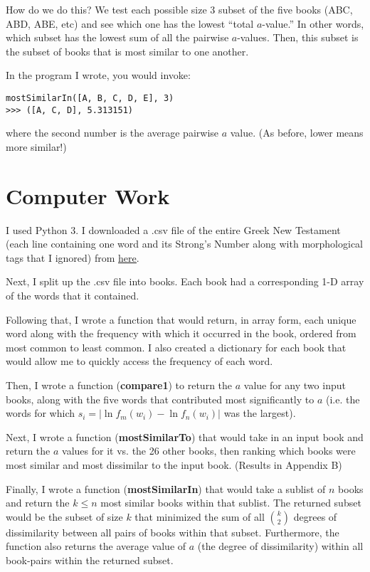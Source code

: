 \documentclass[12pt,letterpaper]{article}
\begin{document}
How do we do this?  We test each possible size 3 subset of the five books (ABC, ABD, ABE, etc) and see which one has the lowest ``total $a$-value.''  In other words, which subset has the lowest sum of all the pairwise $a$-values.  Then, this subset is the subset of books that is most similar to one another.

In the program I wrote, you would invoke:
\begin{verbatim}
mostSimilarIn([A, B, C, D, E], 3)
>>> ([A, C, D], 5.313151)
\end{verbatim}
where the second number is the average pairwise $a$ value.  (As before, lower means more similar!)

\section{Computer Work}
I used Python 3.  I downloaded a .csv file of the entire Greek New Testament (each line containing one word and its Strong's Number along with morphological tags that I ignored) from \underline{\href{https://github.com/biblicalhumanities/Nestle1904/tree/master/morph}{here}}.  

Next, I split up the .csv file into books.  Each book had a corresponding 1-D array of the words that it contained.  

Following that, I wrote a function that would return, in array form, each unique word along with the frequency with which it occurred in the book, ordered from most common to least common.  I also created a dictionary for each book that would allow me to quickly access the frequency of each word.

Then, I wrote a function (\textbf{compare1}) to return the $a$ value for any two input books, along with the five words that contributed most significantly to $a$ (i.e. the words for which $s_i = |\ln f_m(w_i) - \ln f_n(w_i)|$ was the largest).  

Next, I wrote a function (\textbf{mostSimilarTo}) that would take in an input book and return the $a$ values for it vs. the 26 other books, then ranking which books were most similar and most dissimilar to the input book. (Results in Appendix B)

Finally, I wrote a function (\textbf{mostSimilarIn}) that would take a sublist of $n$ books and return the $k\leq n$ most similar books within that sublist.  The returned subset would be the subset of size $k$ that minimized the sum of all $\binom{k}{2}$ degrees of dissimilarity between all pairs of books within that subset.  Furthermore, the function also returns the average value of $a$ (the degree of dissimilarity) within all book-pairs within the returned subset.  
\end{document}
